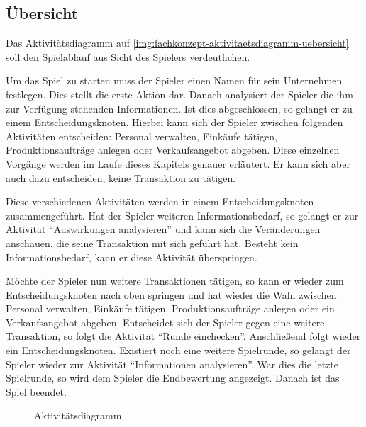 \subsection{Übersicht}
\label{sec:fachkonzept-aktivitaetsdiagramm-uebersicht}

Das Aktivitätsdiagramm auf \vref{img:fachkonzept-aktivitaetsdiagramm-uebersicht} soll den Spielablauf aus Sicht des Spielers verdeutlichen.  

Um das Spiel zu starten muss der Spieler einen Namen für sein Unternehmen festlegen. Dies stellt die erste Aktion dar. Danach analysiert der Spieler die ihm zur Verfügung stehenden Informationen. Ist dies abgeschlossen, so gelangt er zu einem Entscheidungsknoten. Hierbei kann sich der Spieler zwischen folgenden Aktivitäten entscheiden: Personal verwalten, Einkäufe tätigen, Produktionsaufträge anlegen oder Verkaufsangebot abgeben. Diese einzelnen Vorgänge werden im Laufe dieses Kapitels genauer erläutert. Er kann sich aber auch dazu entscheiden, keine Transaktion zu tätigen. 

Diese verschiedenen Aktivitäten werden in einem Entscheidungsknoten zusammengeführt. Hat der Spieler weiteren Informationsbedarf, so gelangt er zur Aktivität “Auswirkungen analysieren” und kann sich die Veränderungen anschauen, die seine Transaktion mit sich geführt hat. Besteht kein Informationsbedarf, kann er diese Aktivität überspringen. 

Möchte der Spieler nun weitere Transaktionen tätigen, so kann er wieder zum Entscheidungsknoten nach oben springen und hat wieder die Wahl zwischen Personal verwalten, Einkäufe tätigen, Produktionsaufträge anlegen oder ein Verkaufsangebot abgeben. Entscheidet sich der Spieler gegen eine weitere Transaktion, so folgt die Aktivität “Runde einchecken”. Anschließend folgt wieder ein Entscheidungsknoten. Existiert noch eine weitere Spielrunde, so gelangt der Spieler wieder zur Aktivität “Informationen analysieren”. War dies die letzte Spielrunde, so wird dem Spieler die Endbewertung angezeigt. Danach ist das Spiel beendet.

\begin{figure}[h]
  \centering
  \caption{Aktivitätsdiagramm}
  \label{img:fachkonzept-aktivitaetsdiagramm-uebersicht}
\end{figure}